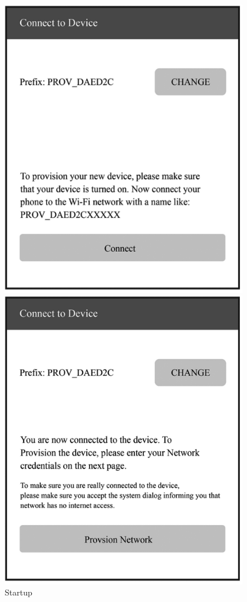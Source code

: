 \documentclass[a4paper,12pt,openany]{book}
\begin{document}
\begin{figure}[!h]
  \Centering
  \begin{minipage}[b]{0.4\textwidth}
    \includegraphics[width=0.95\textwidth]{D7Z/7-35}
    \caption{Startup}
  \end{minipage}\hspace{1em}
  \begin{minipage}[b]{0.4\textwidth}
    \includegraphics[width=0.95\textwidth]{D7Z/7-36}

\end{minipage}
\end{figure}
\end{document}
